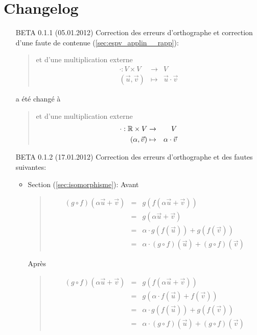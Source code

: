 \chapter{Changelog}
\begin{itemize}
  \item[BETA 0.1.1 (05.01.2012)] Correction des erreurs d'orthographe et correction d'une faute de contenue (\ref{sec:espv_applin__rapp}):
    \begin{quote}
      et d'une multiplication externe
      \begin{eqnarray*}
        \cdot: V \times V &\rightarrow& V \\
        (\vec{u}, \vec{v}) &\mapsto&  \vec{u} \cdot \vec{v}
      \end{eqnarray*}
    \end{quote}
    a été changé à
    \begin{quote}
      et d'une multiplication externe
      \begin{eqnarray*}
        \cdot: \mathbb{R} \times V &\rightarrow& V \\
        (\alpha, \vec{v}) &\mapsto& \alpha \cdot \vec{v}
      \end{eqnarray*}
    \end{quote}

  \item[BETA 0.1.2 (17.01.2012)] Correction des erreurs d'orthographe et des fautes suivantes:
    \begin{itemize}
      \item Section (\ref{sec:isomorphisme}): Avant
        \begin{quote}
          \begin{eqnarray*}
            (g \circ f)(\alpha \vec{u} +\vec{v}) &=& g(f(\alpha \vec{u} +\vec{v})) \\
              &=& g(\alpha \vec{u} + \vec{v}) \\
              &=& \alpha \cdot g(f(\vec{u})) + g(f(\vec{v})) \\
              &=& \alpha \cdot (g \circ f)(\vec{u}) + (g \circ f)(\vec{v})
          \end{eqnarray*}
        \end{quote}
        Après
        \begin{quote}
          \begin{eqnarray*}
            (g \circ f)(\alpha \vec{u} +\vec{v}) &=& g(f(\alpha \vec{u} +\vec{v})) \\
              &=& g(\alpha \cdot f(\vec{u}) + f(\vec{v})) \\
              &=& \alpha \cdot g(f(\vec{u})) + g(f(\vec{v})) \\
              &=& \alpha \cdot (g \circ f)(\vec{u}) + (g \circ f)(\vec{v})
          \end{eqnarray*}
        \end{quote}
      

\end{itemize}
\end{itemize}
